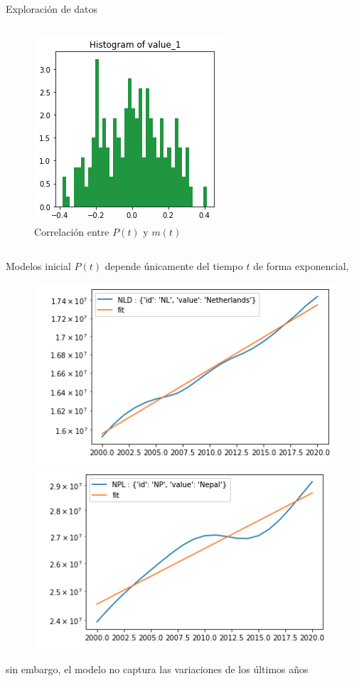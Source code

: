 \documentclass[10pt]{beamer}
\begin{document}
\begin{frame}{Exploración de datos}
\begin{columns}
\begin{column}{0.65\textwidth}
\begin{figure}
\centering
     \includegraphics[scale=0.3]{img/6.png}
     \caption{Correlación entre $P(t)$ y $m(t)$}
     \end{figure}
\end{column}
\end{columns}
\end{frame}

\begin{frame}{Modelos inicial}
$P(t)$ depende únicamente del tiempo $t$ de forma exponencial, 
\begin{figure}
\includegraphics[scale=0.35]{img/7.png}
\includegraphics[scale=0.35]{img/8.png}
\end{figure}
sin embargo, el modelo no captura las variaciones de los últimos años
\end{frame}
\end{document}
